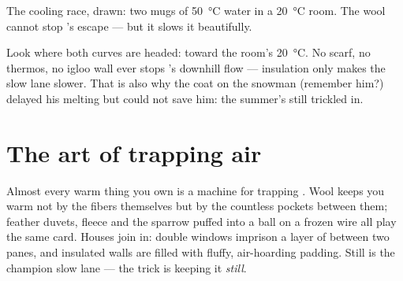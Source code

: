 \begin{omfigure}

{\small The cooling race, drawn: two mugs of \qty{50}{\celsius}
water in a \qty{20}{\celsius} room. The wool cannot stop 's
escape --- but it slows it beautifully.}
\end{omfigure}

\begin{remark}\label{rem:g5:heat-and-insulation:onlyslows}
Look where both curves are headed: toward the room's
\qty{20}{\celsius}. No scarf, no thermos, no igloo wall ever stops
's downhill flow --- insulation only makes the slow lane
slower. That is also why the coat on the snowman (remember him?)
delayed his melting but could not save him: the summer's  still
trickled in.
\end{remark}

\section{The art of trapping air}

\begin{example}\label{ex:g5:heat-and-insulation:air}
Almost every warm thing you own is a machine for trapping .
Wool keeps you warm not by the fibers themselves but by the
countless  pockets between them; feather duvets, fleece and the
sparrow puffed into a ball on a frozen wire all play the same
card. Houses join in: double windows imprison a layer of 
between two panes, and insulated walls are filled with fluffy,
air-hoarding padding. Still  is the champion slow lane --- the
trick is keeping it \emph{still}.
\end{example}

